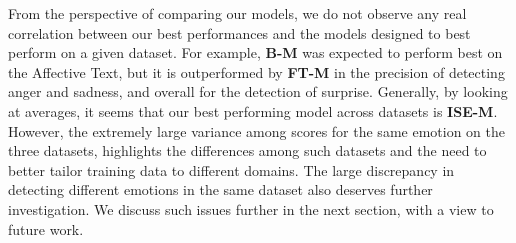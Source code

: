 \documentclass[11pt]{article}
\begin{document}


From the perspective of comparing our models, we do not observe any real correlation between our best performances and the models designed to best perform on a given dataset. For example, \textbf{B-M} was expected to perform best on the Affective Text, but it is outperformed by \textbf{FT-M} in the precision of detecting anger and sadness, and overall for the detection of surprise. Generally, by looking at averages, it seems that our best performing model across datasets is \textbf{ISE-M}. However, the extremely large variance among scores for the same emotion on the three datasets, highlights the differences among such datasets  and the need to better tailor training data to different domains. The large discrepancy in detecting different emotions in the same dataset also deserves further investigation. We discuss such issues further in the next section, with a view to future work.







%
%
%
\end{document}
